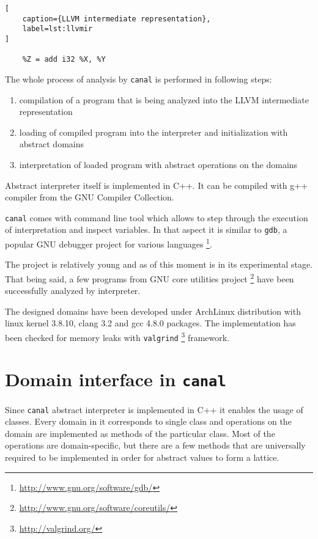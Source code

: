 \documentclass[12pt,final,oneside]{fithesis2}
\theoremstyle{definition}
\begin{document}
\begin{lstlisting}[
    caption={LLVM intermediate representation},
    label=lst:llvmir
]

    %Z = add i32 %X, %Y

\end{lstlisting}

The whole process of analysis by \texttt{canal} is performed in following
steps:

\begin{enumerate}

\item compilation of a program that is being analyzed into the LLVM
intermediate representation

\item loading of compiled program into the interpreter and initialization
with abstract domains

\item interpretation of loaded program with abstract operations on the
domains

\end{enumerate}

Abstract interpreter itself is implemented in C++. It can be compiled with
g++ compiler from the GNU Compiler Collection.

\texttt{canal} comes with command line tool which allows to step through
the execution of interpretation and inspect variables. In that aspect it
is similar to \texttt{gdb}, a popular GNU debugger project for various
languages \footnote{\url{http://www.gnu.org/software/gdb/}}.

The project is relatively young and as of this moment is in its experimental
stage. That being said, a few programs from GNU core utilities project
\footnote{\url{http://www.gnu.org/software/coreutils/}} have been
successfully analyzed by interpreter.

The designed domains have been developed under ArchLinux distribution
with linux kernel 3.8.10, clang 3.2 and gcc 4.8.0 packages. The implementation
has been checked for memory leaks with \texttt{valgrind}
\footnote{\url{http://valgrind.org/}} framework.


\section{Domain interface in \texttt{canal}}

Since \texttt{canal} abstract interpreter is implemented in C++ it enables
the usage of classes. Every domain in it corresponds to single class and
operations on the domain are implemented as methods of the particular class.
Most of the operations are domain-specific, but there are a few methods
that are universally required to be implemented in order for abstract
values to form a lattice.
\end{document}
